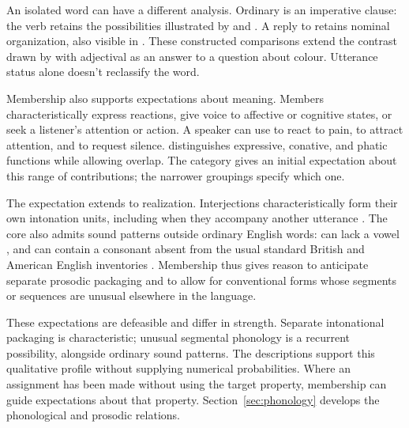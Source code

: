 \documentclass[12pt]{article}
\begin{document}
An isolated word can have a different analysis. Ordinary 
is an imperative clause: the verb retains the possibilities illustrated
by  and . A reply
 to  retains nominal
organization, also visible in . These constructed
comparisons extend the contrast drawn by \textcite[124--125]{wilkins1992}
with adjectival  as an answer to a question about colour.
Utterance status alone doesn't reclassify the word.

Membership also supports expectations about meaning. Members characteristically express reactions, give voice to affective or
cognitive states, or seek a listener's attention or action. A speaker can
use  to react to pain,  to attract attention,
and  to request silence. \textcite[113--115]{ameka1992}
distinguishes expressive, conative, and phatic functions while allowing
overlap. The category gives an initial expectation about this range of
contributions; the narrower groupings specify which one.

The expectation extends to realization. Interjections characteristically
form their own intonation units, including when they accompany another
utterance \citep[108]{ameka1992}. The core also admits sound patterns
outside ordinary English words:  can lack a vowel
\citep[105--106]{ameka1992}, and
 can contain a consonant absent from the usual standard
British and American English inventories
\citep[74, 853]{quirk1985}.
Membership thus gives reason to anticipate separate prosodic packaging and
to allow for conventional forms whose segments or sequences are unusual
elsewhere in the language.

These expectations are defeasible and differ in strength. Separate
intonational packaging is characteristic; unusual segmental phonology is
a recurrent possibility, alongside ordinary sound patterns. The descriptions
support this qualitative profile without supplying numerical probabilities.
Where an assignment has been made without using the target property,
membership can guide expectations about that property.
Section~\ref{sec:phonology} develops the phonological and prosodic relations.
\end{document}
